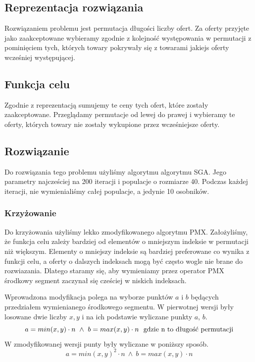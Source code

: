 \subsection{Reprezentacja rozwiązania}
Rozwiązaniem problemu jest permutacja długości liczby ofert.
Za oferty przyjęte jako zaakceptowane wybieramy zgodnie z kolejność występowania w permutacji z pominięciem tych, których towary pokrywały się z towarami jakiejs oferty wcześniej występującej.

\subsection{Funkcja celu}
Zgodnie z reprezentacją sumujemy te ceny tych ofert, które zostały zaakceptowane. Przeglądamy permutacje od lewej do prawej i wybieramy te oferty, których towary nie zostały wykupione przez wcześniejsze oferty.

\subsection{Rozwiązanie}
Do rozwiązania tego problemu użyliśmy algorytmu algorytmu SGA.
Jego parametry najcześciej na 200 iteracji i populacje o rozmiarze 40.
Podczas każdej iteracji, nie wymienialiśmy całej populacje, a jedynie 10 osobników.

\subsubsection{Krzyżowanie}
Do krzyżowania użyliśmy lekko zmodyfikowanego algorytmu PMX.
Założyliśmy, że funkcja celu zależy bardziej od elementów o mniejszym indeksie w permutacji niż większym.
Elementy o mniejszy indeksie są bardziej preferowane co wynika z funkcji celu, a oferty o dalszych indeksach mogą być często wogle nie brane do rozwiazania.
Dlatego staramy się, aby wymieniamy przez operator PMX środkowy segment zaczynał się cześciej w niskich indeksach.


Wprowadzona modyfikacja polega na wyborze punktów $a$ i $b$ będących przedziałem wymienianego środkowego segmentu.
W pierwotnej wersji były losowane dwie liczby $x, y$ i na ich podstawie wyliczane punkty $a$, $b$.
\begin{equation}
    a = min(x, y) \cdot n \ \wedge \ b = max(x, y) \cdot n \ \ \hbox{gdzie n to długość permutacji}
\end{equation}
W zmodyfikowanej wersji punty były wyliczane w poniższy sposób.
\begin{equation}
    a = min(x, y)^2 \cdot n \ \wedge \ b = max(x, y) \cdot n
\end{equation}

